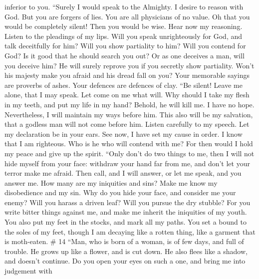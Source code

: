 inferior to you.  ``Surely I would speak to the Almighty.
I desire to reason with God.  But you are forgers of lies.
You are all physicians of no value.  Oh that you would be
completely silent! Then you would be wise.  Hear now my
reasoning. Listen to the pleadings of my lips.  Will you
speak unrighteously for God, and talk deceitfully for him?
 Will you show partiality to him? Will you contend for
God?  Is it good that he should search you out? Or as one
deceives a man, will you deceive him?  He will surely
reprove you if you secretly show partiality.  Won't his
majesty make you afraid and his dread fall on you?  Your
memorable sayings are proverbs of ashes. Your defences are defences of
clay.  ``Be silent! Leave me alone, that I may speak. Let
come on me what will.  Why should I take my flesh in my
teeth, and put my life in my hand?  Behold, he will kill
me. I have no hope. Nevertheless, I will maintain my ways before him.
 This also will be my salvation, that a godless man will
not come before him.  Listen carefully to my speech. Let
my declaration be in your ears.  See now, I have set my
cause in order. I know that I am righteous.  Who is he
who will contend with me? For then would I hold my peace and give up the
spirit.  ``Only don't do two things to me, then I will
not hide myself from your face:  withdraw your hand far
from me, and don't let your terror make me afraid.  Then
call, and I will answer, or let me speak, and you answer me.
 How many are my iniquities and sins? Make me know my
disobedience and my sin.  Why do you hide your face, and
consider me your enemy?  Will you harass a driven leaf?
Will you pursue the dry stubble?  For you write bitter
things against me, and make me inherit the iniquities of my youth.
 You also put my feet in the stocks, and mark all my
paths. You set a bound to the soles of my feet,  though I
am decaying like a rotten thing, like a garment that is moth-eaten. \#
14  ``Man, who is born of a woman, is of few days, and
full of trouble.  He grows up like a flower, and is cut
down. He also flees like a shadow, and doesn't continue. 
Do you open your eyes on such a one, and bring me into judgement with
